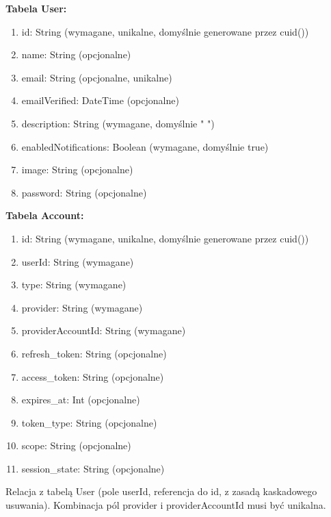 \documentclass[12pt]{article}
\begin{document}
\noindent\hspace{0.6cm}\textbf{\large Tabela User:}\vspace{-10pt}
\begin{enumerate}[label=\textbullet, leftmargin=1.2cm, itemsep=-6pt]
	\item id: String (wymagane, unikalne, domyślnie generowane przez cuid())
	\item name: String (opcjonalne)
	\item email: String (opcjonalne, unikalne)
	\item emailVerified: DateTime (opcjonalne)
	\item description: String (wymagane, domyślnie " ")
	\item enabledNotifications: Boolean (wymagane, domyślnie true)
	\item image: String (opcjonalne)
	\item password: String (opcjonalne)
\end{enumerate}

\noindent\hspace{0.6cm}\textbf{\large Tabela Account:}\vspace{-10pt}
\begin{enumerate}[label=\textbullet, leftmargin=1.2cm, itemsep=-6pt]
	\item id: String (wymagane, unikalne, domyślnie generowane przez cuid())
	\item userId: String (wymagane)
	\item type: String (wymagane)
	\item provider: String (wymagane)
	\item providerAccountId: String (wymagane)
	\item refresh\_token: String (opcjonalne)
	\item access\_token: String (opcjonalne)
	\item expires\_at: Int (opcjonalne)
	\item token\_type: String (opcjonalne)
	\item scope: String (opcjonalne)
	\item session\_state: String (opcjonalne)
\end{enumerate}
\vspace{-10pt}
\begin{adjustwidth}{0.5cm}{0pt}
	Relacja z tabelą User (pole userId, referencja do id, z zasadą kaskadowego usuwania).
	Kombinacja pól provider i providerAccountId musi być unikalna.
\end{adjustwidth}
\vspace{10pt}
\end{document}
